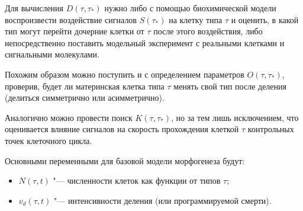 









Для вычисления $D(\tau,\tau_{*})$ нужно либо с помощью биохимической модели воспроизвести воздействие сигналов $S(\tau_{*})$ на клетку типа $\tau$ и оценить, в какой тип могут перейти дочерние клетки от $\tau$ после этого воздействия, либо непосредственно поставить  модельный эксперимент с реальными клетками и сигнальными молекулами. 

Похожим образом можно поступить и с определением параметров $O(\tau,\tau_{*})$, проверив, будет ли материнская клетка типа $\tau$ менять свой тип после деления (делиться симметрично или асимметрично). 



Аналогично можно провести поиск $K(\tau,\tau_{*})$, но за тем лишь исключением, что оценивается влияние сигналов на скорость прохождения клеткой $\tau$ контрольных точек клеточного цикла. %



\smallskip







Основными переменными для базовой модели морфогенеза будут:

\begin{itemize}

	\item $N(\tau,t)$ "--- численности клеток как функции от типов $\tau$;

	\item $v_d(\tau,t)$ "--- интенсивности деления (или программируемой смерти).

\end{itemize}



